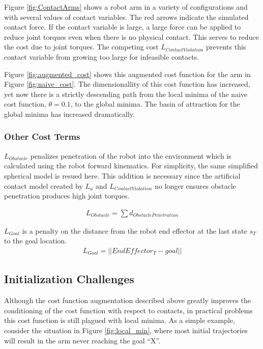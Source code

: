 \documentclass[../thesis.tex]{subfiles}
\begin{document}
Figure \ref{fig:ContactArms} shows a robot arm in a variety of configurations and with several values of contact variables.
The red arrows indicate the simulated contact force.
If the contact variable is large, a large force can be applied to reduce joint torques even when there is no physical contact.
This serves to reduce the cost due to joint torques.
The competing cost $L_{Contact Violation}$ prevents this contact variable from growing too large for infeasible contacts.


Figure \ref{fig:augmented_cost} shows this augmented cost function for the arm in Figure \ref{fig:naive_cost}.
The dimensionallity of this cost function has increased, yet now there is a strictly descending path from the local minima of the naive cost function, $\theta=0.1$, to the global minima.
The basin of attraction for the global minima has increased dramatically.




\subsubsection{Other Cost Terms}
$L_{Obstacle}$ penalizes penetration of the robot into the environment which is calculated using the robot forward kinematics.
For simplicity, the same simplified spherical model is resued here.
This addition is necessary since the artificial contact model created by $L_u$ and $L_{ContactViolation}$ no longer ensures obstacle penetration produces high joint torques.

\begin{align}
  L_{Obstacle} = \sum d_{ObstaclePenetration}
\end{align}

$L_{Goal}$ is a penalty on the distance from the robot end effector at the last state $s_T$ to the goal location.
\begin{align}
  L_{Goal} = ||EndEffector_T - goal||
\end{align}


\subsection{Initialization Challenges}
Although the cost function augmentation described above greatly improves the conditioning of the cost function with respect to contacts, in practical problems this cost function is still plagued with local minima.
As a simple example, consider the situation in Figure \ref{fig:local_min}, where most initial trajectories will result in the arm never reaching the goal ``X''.
\end{document}
